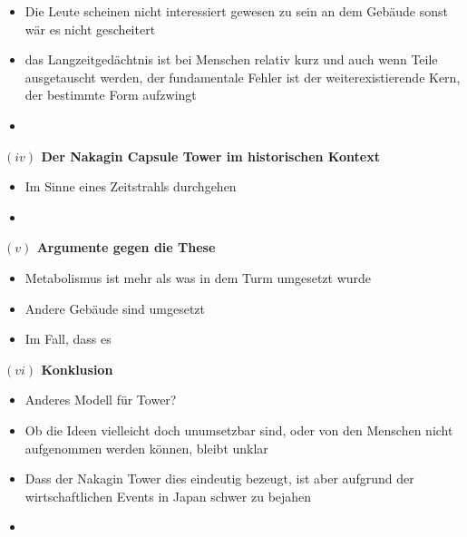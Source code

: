 \documentclass[a4paper, 12pt]{article}
\begin{document}
\begin{onehalfspace}
\begin{itemize}
  \item Die Leute scheinen nicht interessiert gewesen zu sein an dem Gebäude sonst wär es nicht gescheitert
  \item das Langzeitgedächtnis ist bei Menschen relativ kurz und auch wenn Teile ausgetauscht werden, der fundamentale Fehler ist der weiterexistierende Kern, der bestimmte Form aufzwingt
  \item 
\end{itemize}



\vspace{5mm}
\noindent\textbf{$(iv)$ Der Nakagin Capsule Tower im historischen Kontext}



\begin{itemize}
  \item Im Sinne eines Zeitstrahls durchgehen
  \item 
\end{itemize}



\vspace{5mm}
\noindent\textbf{$(v)$ Argumente gegen die These}



\begin{itemize}
  \item Metabolismus ist mehr als was in dem Turm umgesetzt wurde
  \item Andere Gebäude sind umgesetzt
  \item Im Fall, dass es 
\end{itemize}




\vspace{5mm}
\noindent\textbf{$(vi)$ Konklusion}

\begin{itemize}
  \item Anderes Modell für Tower?
  \item Ob die Ideen vielleicht doch unumsetzbar sind, oder von den Menschen nicht aufgenommen werden können, bleibt unklar
  \item Dass der Nakagin Tower dies eindeutig bezeugt, ist aber aufgrund der wirtschaftlichen Events in Japan schwer zu bejahen
  \item 
\end{itemize}


\end{onehalfspace}
\printbibliography

%
\end{document}
